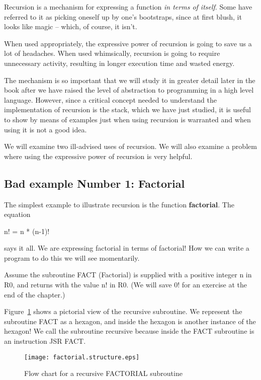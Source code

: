 \documentclass{patt}
\begin{document}
Recursion is a mechanism for expressing a function {\em in terms of itself}.  
Some have referred to it as picking oneself up by one's bootstraps, since at 
first blush, it looks like magic -- which, of course, it isn't.

When used appropriately, the expressive power of recursion is going to save us 
a lot of headaches.  When used whimsically, recursion is going to require 
unnecessary activity, resulting in longer execution time and wasted energy.  

The mechanism is so important that we will study it in greater detail later in
the book after we have raised the level of abstraction to programming in a
high level language.  However, since a critical concept needed to understand
the implementation of recursion is the stack, which we have just studied, it
is useful to show by means of examples just when using recursion is warranted 
and when using it is not a good idea.

We will examine two ill-advised uses of recursion.  We will also examine 
a problem where using the expressive power of recursion is very helpful.

\subsection{Bad example Number 1: Factorial}

The simplest example to illustrate recursion is the function {\bf factorial}.  
The equation

\begin{center}
		n! = n * (n-1)!
\end{center}

\noindent
says it all.  We are expressing factorial in terms of factorial!  How we can
write a program to do this we will see momentarily.

Assume the subroutine FACT (Factorial) is supplied with a positive integer n 
in R0, and returns with the value n! in R0.  (We will save 0! for an exercise
at the end of the chapter.)

Figure~\ref{fig:factorial.structure} shows a pictorial view of the 
recursive subroutine.
We represent the subroutine FACT as a hexagon, and inside the 
hexagon is another instance of the hexagon!  We call the subroutine recursive 
because inside the FACT subroutine is an instruction JSR FACT.

\begin{figure}[h]
\centerline{\texttt{[image: factorial.structure.eps]}}
\caption{Flow chart for a recursive FACTORIAL subroutine}
\label{fig:factorial.structure}
\end{figure}
\end{document}
